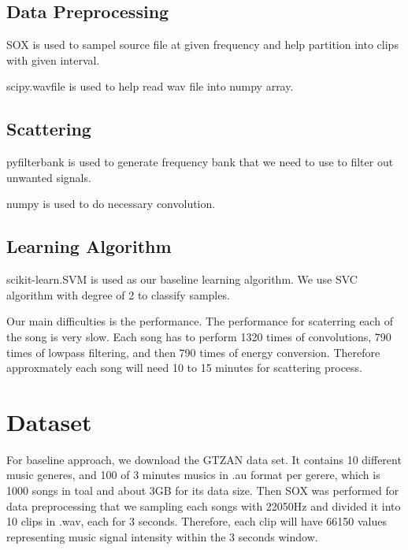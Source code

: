 \documentclass[final]{siamltexmm}
\begin{document}
\subsection{Data Preprocessing}
\begin{remunerate}
\item SOX is used to sampel source file at given frequency and help partition into clips with given interval.
\item scipy.wavfile is used to help read wav file into numpy array.
\end{remunerate}
\subsection{Scattering}
\begin{remunerate}
\item pyfilterbank is used to generate frequency bank that we need to use to filter out unwanted signals.
\item numpy is used to do necessary convolution.
\end{remunerate}
\subsection{Learning Algorithm}
\begin{remunerate}
\item scikit-learn.SVM is used as our baseline learning algorithm.  We use SVC algorithm with degree of 2 to classify samples.
\end{remunerate}

Our main difficulties is the performance.  The performance for scaterring each of the song is very slow. Each song has to perform 1320 times of convolutions, 790 times of lowpass filtering, and then 790 times of energy conversion. Therefore approxmately each song will need 10 to 15 minutes for scattering process.
\section{Dataset}
For baseline approach, we download the GTZAN data set. It contains 10 different music generes, and 100 of 3 minutes musics in .au format per gerere, which is 1000 songs in toal and about 3GB for its data size. Then SOX was performed for data preprocessing that we sampling each songs with 22050Hz and divided it into 10 clips in .wav, each for 3 seconds. Therefore, each clip will have 66150 values representing music signal intensity within the 3 seconds window.
\end{document}
